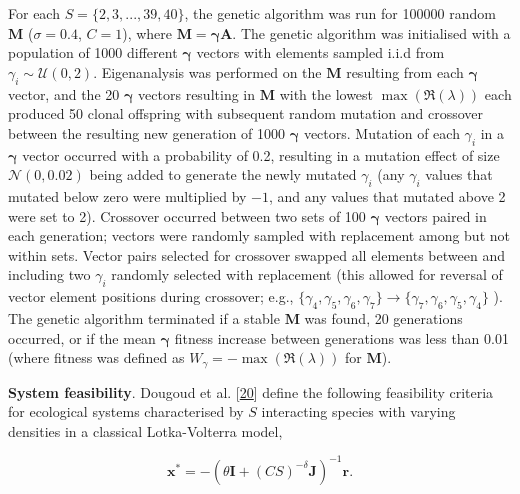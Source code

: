 \documentclass[]{article}
\begin{document}
For each \(S = \{2, 3, ..., 39, 40\}\), the genetic algorithm was run
for 100000 random \(\mathbf{M}\) (\(\sigma = 0.4\), \(C = 1\)), where
\(\mathbf{M = \gamma A}\). The genetic algorithm was initialised with a
population of 1000 different \(\mathbf{\gamma}\) vectors with elements
sampled i.i.d from \(\gamma_{i} \sim \mathcal{U}(0, 2)\). Eigenanalysis
was performed on the \(\mathbf{M}\) resulting from each
\(\mathbf{\gamma}\) vector, and the 20 \(\mathbf{\gamma}\) vectors
resulting in \(\mathbf{M}\) with the lowest
\(\max\left(\Re(\lambda)\right)\) each produced 50 clonal offspring with
subsequent random mutation and crossover between the resulting new
generation of 1000 \(\mathbf{\gamma}\) vectors. Mutation of each
\(\gamma_{i}\) in a \(\mathbf{\gamma}\) vector occurred with a
probability of 0.2, resulting in a mutation effect of size
\(\mathcal{N}(0, 0.02)\) being added to generate the newly mutated
\(\gamma_{i}\) (any \(\gamma_{i}\) values that mutated below zero were
multiplied by \(-1\), and any values that mutated above 2 were set to
2). Crossover occurred between two sets of 100 \(\mathbf{\gamma}\)
vectors paired in each generation; vectors were randomly sampled with
replacement among but not within sets. Vector pairs selected for
crossover swapped all elements between and including two \(\gamma_{i}\)
randomly selected with replacement (this allowed for reversal of vector
element positions during crossover; e.g.,
\(\{\gamma_{4}, \gamma_{5}, \gamma_{6}, \gamma_{7}\} \to \{\gamma_{7}, \gamma_{6}, \gamma_{5}, \gamma_{4}\}\)
). The genetic algorithm terminated if a stable \(\mathbf{M}\) was
found, 20 generations occurred, or if the mean \(\mathbf{\gamma}\)
fitness increase between generations was less than 0.01 (where fitness
was defined as \(W_{\gamma} = -\max\left(\Re(\lambda)\right)\) for
\(\mathbf{M}\)).

\textbf{System feasibility}. Dougoud et al.
{[}\protect\hyperlink{ref-Dougoud2018}{20}{]} define the following
feasibility criteria for ecological systems characterised by \(S\)
interacting species with varying densities in a classical Lotka-Volterra
model,

\[\mathbf{x^{*}} = -\left(\theta \mathbf{I} + (CS)^{-\delta}\mathbf{J} \right)^{-1}\mathbf{r}.\]
\end{document}
